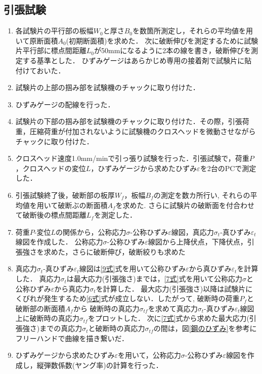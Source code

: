 \documentclass[a4paper,11pt,uplatex]{jsarticle}
\begin{document}
\subsection{引張試験}
\begin{enumerate}
  \item 各試験片の平行部の板幅$W_0$と厚さ$B_0$を数箇所測定し，それらの平均値を用いて原断面積$A_0$(初期断面積)を求めた．
  次に破断伸びを測定するために試験片平行部に標点間距離$L_0$が50mmになるように2本の線を書き，破断伸びを測定する基準とした．
  ひずみゲージはあらかじめ専用の接着剤で試験片に貼付けておいた．
  \item 試験片の上部の掴み部を試験機のチャックに取り付けた．
  \item ひずみゲージの配線を行った．
  \item 試験片の下部の掴み部を試験機のチャックに取り付けた．その際，引張荷重，圧縮荷重が付加されないように試験機のクロスヘッドを微動させながらチャックに取り付けた．
  \item クロスヘッド速度1.0mm/minで引っ張り試験を行った．引張試験で，荷重$P$，クロスヘッドの変位$L$，ひずみゲージから求めたひずみ$\varepsilon$を2台のPCで測定した．
  \item 引張試験終了後，破断部の板厚$W_f$，板幅$B_f$の測定を数カ所行い, それらの平均値を用いて破断ぶの断面積$A_f$を求めた.
  さらに試験片の破断面を付合わせて破断後の標点間距離$L_f$を測定した．
  \item 荷重$P$-変位$L$の関係から，公称応力$\sigma$-公称ひずみ$\varepsilon$線図，真応力$\sigma_t$-真ひずみ$\varepsilon_t$線図を作成した．
  公称応力$\sigma$-公称ひずみ$\varepsilon$線図から上降伏点，下降伏点，引張強さを求めた，さらに破断伸び，破断絞りも求めた
  \item 真応力$\sigma_t$-真ひずみ$\varepsilon_t$線図は\ref{9式}式を用いて公称ひずみ$\varepsilon$から真ひずみ$\varepsilon_t$を計算した．
  真応力$\sigma_t$は最大応力(引張強さ)までは，\ref{7式}式を用いて公称応力$\sigma$と公称ひずみ$\varepsilon$から真応力$\sigma_t$を計算した．
  最大応力(引張強さ)以降は試験片にくびれが発生するため\ref{6式}式が成立しない．したがって, 破断時の荷重$P_f$と破断部の断面積$A_f$から
  破断時の真応力$\sigma_{tf}$を求めて真応力$\sigma_t$-真ひずみ$\varepsilon_t$線図上に破断時の真応力$\sigma_{tf}$をプロットした．
  次に\ref{7式}式から求めた最大応力(引張強さ)までの真応力$\sigma_t$と破断時の真応力$\sigma_{tf}$の間は，図\ref{鋼のひずみ}を参考にフリーハンドで曲線を描き繋いだ．
  \item ひずみゲージから求めたひずみ$\varepsilon$を用いて，公称応力$\sigma$-公称ひずみ$\varepsilon$線図を作成し，縦弾数係数(ヤング率)の計算を行った．

\end{enumerate}
\end{document}
